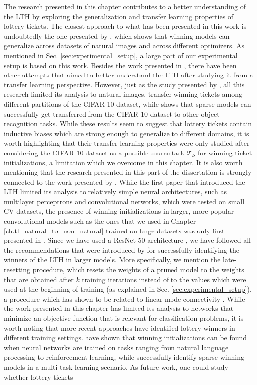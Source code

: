 The research presented in this chapter contributes to a better understanding of the LTH by exploring the generalization and transfer learning properties of lottery tickets. The closest approach to what has been presented in this work is undoubtedly the one presented by \citet{morcos2019one}, which shows that winning models can generalize across datasets of natural images and across different optimizers. As mentioned in Sec. \ref{sec:experimental_setup}, a large part of our experimental setup is based on this work. Besides the work presented in \cite{morcos2019one}, there have been other attempts that aimed to better understand the LTH after studying it from a transfer learning perspective. However, just as the study presented by \citet{morcos2019one}, all this research limited its analysis to natural images. \citet{van2019using} transfer winning tickets among different partitions of the CIFAR-10 dataset, while \citet{mehta2019sparse} shows that sparse models can successfully get transferred from the CIFAR-10 dataset to other object recognition tasks. While these results seem to suggest that lottery tickets contain inductive biases which are strong enough to generalize to different domains, it is worth highlighting that their transfer learning properties were only studied after considering the CIFAR-10 dataset as a possible source task $\mathcal{T}_S$ for winning ticket initializations, a limitation which we overcome in this chapter. It is also worth mentioning that the research presented in this part of the dissertation is strongly connected to the work presented by \citet{franklestabilizing}. While the first paper that introduced the LTH limited its analysis to relatively simple neural architectures, such as multilayer perceptrons and convolutional networks, which were tested on small CV datasets, the presence of winning initializations in larger, more popular convolutional models such as the ones that we used in Chapter \ref{ch:tl_natural_to_non_natural} trained on large datasets \cite{russakovsky2015imagenet} was only first presented in \cite{franklestabilizing}. Since we have used a ResNet-50 architecture \cite{he2016deep}, we have followed all the recommendations that were introduced by \citet{franklestabilizing} for successfully identifying the winners of the LTH in larger models. More specifically, we mention the late-resetting procedure, which resets the weights of a pruned model to the weights that are obtained after $k$ training iterations instead of to the values which were used at the beginning of training (as explained in Sec. \ref{sec:experimental_setup}), a procedure which has shown to be related to linear mode connectivity \cite{frankle2019linear}. While the work presented in this chapter has limited its analysis to networks that minimize an objective function that is relevant for classification problems, it is worth noting that more recent approaches have identified lottery winners in different training settings. \citet{yu2019playing} have shown that winning initializations can be found when neural networks are trained on tasks ranging from natural language processing to reinforcement learning, while \citet{sun2019learning} successfully identify sparse winning models in a multi-task learning scenario. As future work, one could study whether lottery tickets 